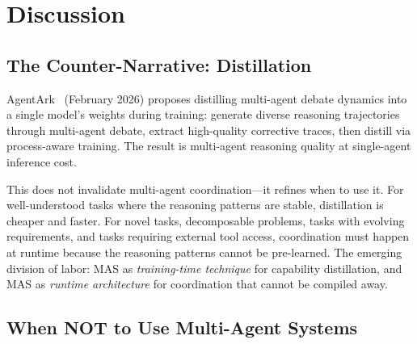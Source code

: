 \documentclass{article}
\begin{document}
\section{Discussion}
\label{sec:discussion}

\subsection{The Counter-Narrative: Distillation}
\label{sec:disc-distill}

%
%

AgentArk~\citep{luo2026agentark} (February 2026) proposes distilling multi-agent debate
dynamics into a single model's weights during training: generate diverse reasoning
trajectories through multi-agent debate, extract high-quality corrective traces, then
distill via process-aware training. The result is multi-agent reasoning quality at
single-agent inference cost.

This does not invalidate multi-agent coordination---it refines when to use it. For
well-understood tasks where the reasoning patterns are stable, distillation is cheaper
and faster. For novel tasks, decomposable problems, tasks with evolving requirements,
and tasks requiring external tool access, coordination must happen at runtime because
the reasoning patterns cannot be pre-learned. The emerging division of labor: MAS as
\emph{training-time technique} for capability distillation, and MAS as \emph{runtime
architecture} for coordination that cannot be compiled away.

\subsection{When NOT to Use Multi-Agent Systems}
\label{sec:disc-when-not}

%
%
\end{document}
